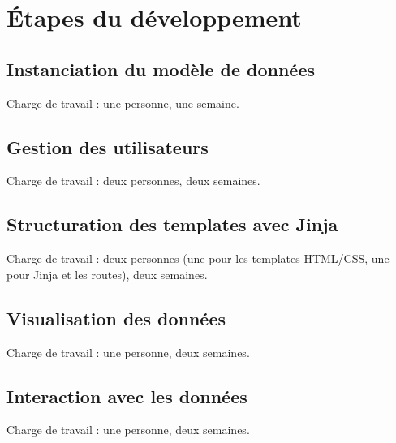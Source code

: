\documentclass[12pt]{article}
\begin{document}
	\section{Étapes du développement}
	
	\subsection*{Instanciation du modèle de données}
	
	Charge de travail : une personne, une semaine.
	
	\subsection*{Gestion des utilisateurs}
	
	Charge de travail : deux personnes, deux semaines.
	
	\subsection*{Structuration des templates avec Jinja}
	
	Charge de travail : deux personnes (une pour les templates HTML/CSS, une pour Jinja et les routes), deux semaines.
	
	\subsection*{Visualisation des données}
	
	Charge de travail : une personne, deux semaines.
	
	\subsection*{Interaction avec les données}
	
	Charge de travail : une personne, deux semaines.
		
\end{document}
